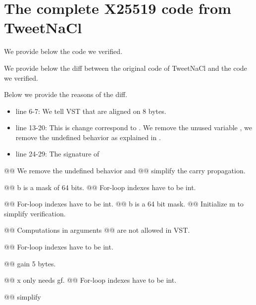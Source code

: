 \section{The complete X25519 code from TweetNaCl}
\label{verified-C-and-diff}

 We provide below the code we verified.



 We provide below the diff between the original code of TweetNaCl and the code we verified.



Below we provide the reasons of the diff.

\begin{itemize}
  \item line 6-7: We tell VST that  are aligned on 8 bytes.

  \item line 13-20: This is change correspond to .
  We remove the unused variable , we remove the undefined behavior as explained in .

  \item line 24-29: The signature of 
\end{itemize}

@@ We remove the undefined behavior and
@@ simplify the carry propagation.

@@ b is a mask of 64 bits.
@@ For-loop indexes have to be int.

@@ For-loop indexes have to be int.
@@ b is a 64 bit mask.
@@ Initialize m to simplify verification.

@@ Computations in arguments
@@ are not allowed in VST.

@@ For-loop indexes have to be int.

@@ gain 5 bytes.

@@ x only needs gf.
@@ For-loop indexes have to be int.

@@ simplify

